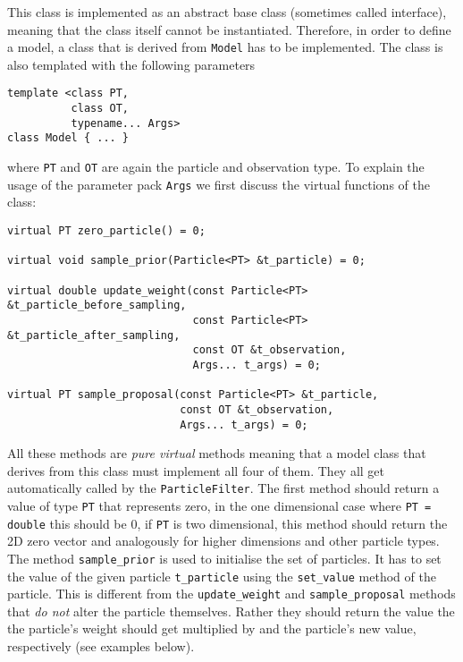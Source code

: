 This class is implemented as an abstract base class (sometimes called
interface), meaning that the class itself cannot be
instantiated. Therefore, in order to define a model, a class that is
derived from \texttt{Model} has to be implemented. The class is also
templated with the following parameters
\begin{verbatim}
template <class PT, 
          class OT, 
          typename... Args> 
class Model { ... }
\end{verbatim}
where \texttt{PT} and \texttt{OT} are again the particle and
observation type. To explain the usage of the parameter pack
\texttt{Args} we first discuss the virtual functions of the class:
\begin{verbatim}
virtual PT zero_particle() = 0;

virtual void sample_prior(Particle<PT> &t_particle) = 0;

virtual double update_weight(const Particle<PT> &t_particle_before_sampling,
                             const Particle<PT> &t_particle_after_sampling,
                             const OT &t_observation, 
                             Args... t_args) = 0;

virtual PT sample_proposal(const Particle<PT> &t_particle,
                           const OT &t_observation, 
                           Args... t_args) = 0;
\end{verbatim}
All these methods are \emph{pure virtual} methods meaning that a model
class that derives from this class must implement all four of
them. They all get automatically called by the
\texttt{ParticleFilter}. The first method should return a value of
type \texttt{PT} that represents zero, \ie in the one dimensional case
where \texttt{PT = double} this should be 0, if \texttt{PT} is \eg two
dimensional, this method should return the 2D zero vector and
analogously for higher dimensions and other particle types. The method
\texttt{sample\_prior} is used to initialise the set of particles. It
has to set the value of the given particle \texttt{t\_particle} using
the \texttt{set\_value} method of the particle. This is different from
the \texttt{update\_weight} and \texttt{sample\_proposal} methods that
\emph{do not} alter the particle themselves. Rather they should return
the value the the particle's weight should get multiplied by and the
particle's new value, respectively (see examples below).


